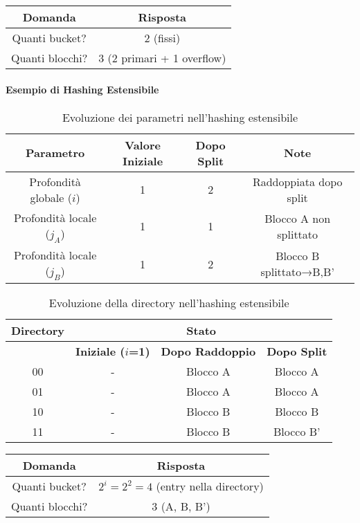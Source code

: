 \begin{center}
\begin{tabular}{|c|c|}
\hline
\textbf{Domanda} & \textbf{Risposta} \\
\hline
Quanti bucket? & 2 (fissi) \\
\hline
Quanti blocchi? & 3 (2 primari + 1 overflow) \\
\hline
\end{tabular}
\end{center}

\paragraph{Esempio di Hashing Estensibile}
\begin{table}[h]
\centering
\begin{tabular}{|c|c|c|c|}
\hline
\textbf{Parametro} & \textbf{Valore Iniziale} & \textbf{Dopo Split} & \textbf{Note} \\
\hline
Profondità globale ($i$) & 1 & 2 & Raddoppiata dopo split \\
\hline
Profondità locale ($j_A$) & 1 & 1 & Blocco A non splittato \\
\hline
Profondità locale ($j_B$) & 1 & 2 & Blocco B splittato→B,B' \\
\hline
\end{tabular}
\caption{Evoluzione dei parametri nell'hashing estensibile}
\end{table}

\begin{table}[h]
\centering
\begin{tabular}{|c|c|c|c|}
\hline
\textbf{Directory} & \multicolumn{3}{c|}{\textbf{Stato}} \\
\hline
& \textbf{Iniziale ($i$=1)} & \textbf{Dopo Raddoppio} & \textbf{Dopo Split} \\
\hline
00 & - & Blocco A & Blocco A \\
\hline
01 & - & Blocco A & Blocco A \\
\hline
10 & - & Blocco B & Blocco B \\
\hline
11 & - & Blocco B & Blocco B' \\
\hline
\end{tabular}
\caption{Evoluzione della directory nell'hashing estensibile}
\end{table}

\begin{center}
\begin{tabular}{|c|c|}
\hline
\textbf{Domanda} & \textbf{Risposta} \\
\hline
Quanti bucket? & $2^i = 2^2 = 4$ (entry nella directory) \\
\hline
Quanti blocchi? & 3 (A, B, B') \\
\hline
\end{tabular}
\end{center}

